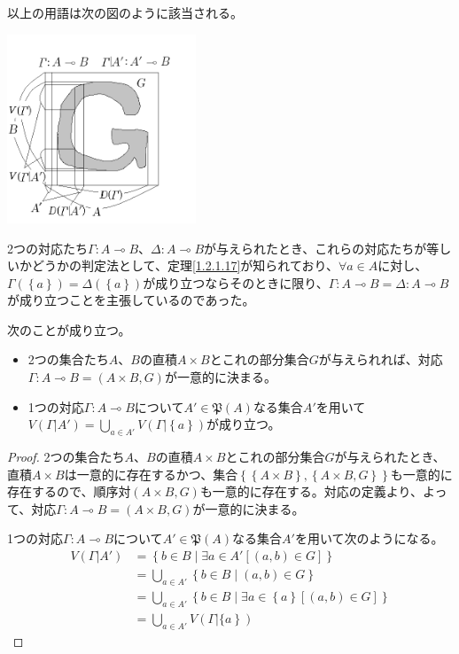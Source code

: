 \documentclass[a4paper]{jsarticle}
\begin{document}
以上の用語は次の図のように該当される。
\begin{center}
\includegraphics[width=160pt]{1.2.1.a.png}
\end{center}
2つの対応たち$\varGamma:A \multimap B$、$\varDelta:A \multimap B$が与えられたとき、これらの対応たちが等しいかどうかの判定法として、定理\ref{1.2.1.17}が知られており、$\forall a \in A$に対し、$\varGamma\left( \left\{ a \right\} \right) = \varDelta\left( \left\{ a \right\} \right)$が成り立つならそのときに限り、$\varGamma:A \multimap B = \varDelta:A \multimap B$が成り立つことを主張しているのであった。
\begin{thm}
\label{1.2.2.6}
次のことが成り立つ。
\begin{itemize}
\item
  2つの集合たち$A$、$B$の直積$A \times B$とこれの部分集合$G$が与えられれば、対応$\varGamma:A \multimap B = (A \times B,G)$が一意的に決まる。
\item
  1つの対応$\varGamma:A \multimap B$について$A'\in \mathfrak{P}(A)$なる集合$A'$を用いて$V\left( \varGamma|A' \right) = \bigcup_{a \in A'} {V\left( \varGamma|\left\{ a \right\} \right)}$が成り立つ。
\end{itemize}
\end{thm}
\begin{proof}
2つの集合たち$A$、$B$の直積$A \times B$とこれの部分集合$G$が与えられたとき、直積$A \times B$は一意的に存在するかつ、集合$\left\{ \left\{ A \times B \right\},\left\{ A \times B,G \right\} \right\}$も一意的に存在するので、順序対$(A \times B,G)$も一意的に存在する。対応の定義より、よって、対応$\varGamma:A \multimap B = (A \times B,G)$が一意的に決まる。\par
1つの対応$\varGamma:A \multimap B$について$A'\in \mathfrak{P}(A)$なる集合$A'$を用いて次のようになる。
\begin{align*}
V\left( \varGamma|A' \right) &= \left\{ b \in B \middle| \exists a \in A'\left[ (a,b) \in G \right] \right\}\\
&= \bigcup_{a \in A'} \left\{ b \in B \middle| (a,b) \in G \right\}\\
&= \bigcup_{a \in A'} \left\{ b \in B \middle| \exists a \in \left\{ a \right\}\left[ (a,b) \in G \right] \right\}\\
&= \bigcup_{a \in A'} {V\left( \varGamma\left| \text{\{}a \right\} \right)}
\end{align*}
\end{proof}
\end{document}

